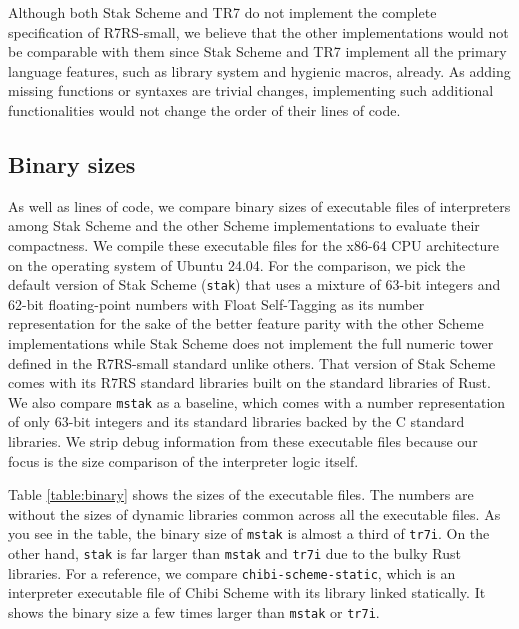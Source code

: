 \documentclass[sigplan, anonymous, review]{acmart}
\begin{document}
Although both Stak Scheme and TR7 do not implement the complete
specification of R7RS-small, we believe that the other
implementations would not be comparable with them since
Stak Scheme and TR7 implement all the primary language features,
such as library system and hygienic macros, already.
As adding missing functions or syntaxes are trivial changes,
implementing such additional functionalities would not change the
order of their lines of code.

\subsection{Binary sizes}

As well as lines of code, we compare binary sizes of executable files of
interpreters among Stak Scheme and the other Scheme implementations
to evaluate their compactness.
We compile these executable files for the x86-64 CPU architecture on
the operating system of Ubuntu 24.04.
For the comparison, we pick the default version of Stak Scheme (\texttt{stak})
that uses a mixture of 63-bit integers and 62-bit floating-point
numbers with Float Self-Tagging \cite{floatselftag} as its number
representation for the sake of the better feature parity with
the other Scheme implementations while Stak Scheme does not implement
the full numeric tower defined in the R7RS-small standard unlike others.
That version of Stak Scheme comes with its R7RS standard libraries built on
the standard libraries of Rust.
We also compare \texttt{mstak} as a baseline, which comes with a number
representation of only 63-bit integers and its standard libraries backed
by the C standard libraries.
We strip debug information from these executable files because
our focus is the size comparison of the interpreter logic itself.

Table \ref{table:binary} shows the sizes of the executable files.
The numbers are without the sizes of dynamic libraries common across
all the executable files.
As you see in the table, the binary size of \texttt{mstak} is almost
a third of \texttt{tr7i}.
On the other hand, \texttt{stak} is far larger than \texttt{mstak} and
\texttt{tr7i} due to the bulky Rust libraries.
For a reference, we compare \texttt{chibi-scheme-static}, which is an
interpreter executable file of Chibi Scheme with its library linked statically.
It shows the binary size a few times larger than \texttt{mstak} or
\texttt{tr7i}.
\end{document}
